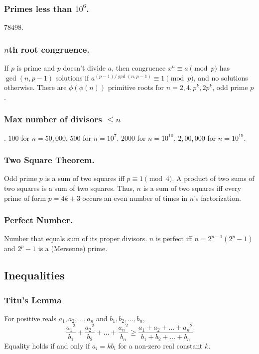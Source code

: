\begin{small}
\subsubsection{Primes less than $10^6$.} $78498$.

\subsubsection{$n$th root congruence.} If $p$ is prime and $p$ doesn't divide $a$, then congruence $x^n \equiv a \pmod p$ has $\gcd(n, p - 1)$ solutions if $a^{(p-1)/\gcd(n,p-1)} \equiv 1 \pmod p$, and no solutions otherwise. There are $\phi(\phi(n))$ primitive roots for $n=2,4,p^k,2p^k$, odd prime $p$.

\subsubsection{Max number of divisors $\leq n$}. $100$ for $n=50,000$. $500$ for $n=10^7$. $2000$ for $n=10^{10}$. $2,00,000$ for $n=10^{19}$. 

\subsubsection{Two Square Theorem.} Odd prime $p$ is a sum of two squares iff $p \equiv 1 \pmod 4$. A product of two sums of two squares is a sum of two squares. Thus, $n$ is a sum of two squares iff every prime of form $p = 4k+3$ occurs an even number of times in $n$’s factorization.

\subsubsection{Perfect Number.} Number that equals sum of its proper divisors. $n$ is perfect iff $n=2^{p-1}(2^p - 1)$ and $2^p - 1$ is a (Mersenne) prime.  


\subsection{Inequalities}
\subsubsection{Titu's Lemma}
For positive reals $a_1, a_2, \ldots, a_n$ and $b_1, b_2, \ldots, b_n$,
$$\frac{{a_1}^2}{b_1} + \frac{{a_2}^2}{b_2} + \ldots + \frac{{a_n}^2}{b_n} \geq \frac{{a_1 + a_2 + \ldots + a_n}^2}{b_1 + b_2 + \ldots + b_n}$$
Equality holds if and only if $ a_i = kb_i$ for a non-zero real constant $k$.


\end{small}
